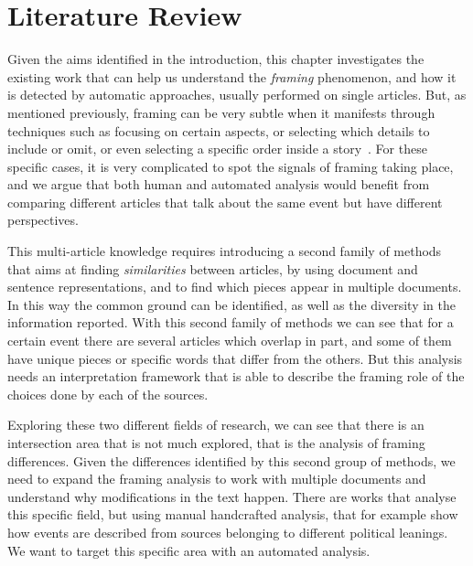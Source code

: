 \chapter{Literature Review}
\label{chap:literature_review}



Given the aims identified in the introduction, this chapter investigates the existing work that can help us understand the \emph{framing} phenomenon, and how it is detected by automatic approaches, usually performed on single articles.
But, as mentioned previously, %
framing can be very subtle when it manifests through techniques such as focusing on certain aspects, or selecting which details to include or omit, or even selecting a specific order inside a story~\cite{morstatter2018identifying}.
For these specific cases, it is very complicated to spot the signals of framing taking place, and we argue that both human and automated analysis would benefit from comparing different articles that talk about the same event but have different perspectives. %

This multi-article knowledge requires introducing a second family of methods that aims at finding \emph{similarities} between articles, by using document and sentence representations, and to find which pieces appear in multiple documents. In this way the common ground can be identified, as well as the diversity in the information reported.
With this second family of methods we can see that for a certain event there are several articles which overlap in part, and some of them have unique pieces or specific words that differ from the others. But this analysis needs an interpretation framework that is able to describe the framing role of the choices done by each of the sources.

Exploring these two different fields of research, we can see that there is an intersection area that is not much explored, that is the analysis of framing differences. Given the differences identified by this second group of methods, we need to expand the framing analysis to work with multiple documents and understand why modifications in the text happen.
There are works that analyse this specific field, but using manual handcrafted analysis, that for example show how events are described from sources belonging to different political leanings. We want to target this specific area with an automated analysis.

